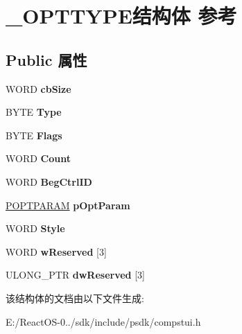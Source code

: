 \hypertarget{struct___o_p_t_t_y_p_e}{}\section{\+\_\+\+O\+P\+T\+T\+Y\+P\+E结构体 参考}
\label{struct___o_p_t_t_y_p_e}
\subsection*{Public 属性}
\begin{DoxyCompactItemize}
\item 
\mbox{\label{struct___o_p_t_t_y_p_e_a18c80c8c2c281085bd93d5357cc864bf}} 
W\+O\+RD {\bfseries cb\+Size}
\item 
\mbox{\label{struct___o_p_t_t_y_p_e_aaf0fd064e909df1f899112fe436e12f1}} 
B\+Y\+TE {\bfseries Type}
\item 
\mbox{\label{struct___o_p_t_t_y_p_e_a9d0ca25c8980f306ef6248d144d51590}} 
B\+Y\+TE {\bfseries Flags}
\item 
\mbox{\label{struct___o_p_t_t_y_p_e_ab263818e39f44378bf88f76feebc069d}} 
W\+O\+RD {\bfseries Count}
\item 
\mbox{\label{struct___o_p_t_t_y_p_e_a8466537cc6dccf4c783e9e999df16774}} 
W\+O\+RD {\bfseries Beg\+Ctrl\+ID}
\item 
\mbox{\label{struct___o_p_t_t_y_p_e_aba9b557645888ae07e119abc410782a9}} 
\hyperlink{struct___o_p_t_p_a_r_a_m}{P\+O\+P\+T\+P\+A\+R\+AM} {\bfseries p\+Opt\+Param}
\item 
\mbox{\label{struct___o_p_t_t_y_p_e_a849378bfe422ceeebb6f9ffa75808400}} 
W\+O\+RD {\bfseries Style}
\item 
\mbox{\label{struct___o_p_t_t_y_p_e_a67bb84590706d679fb037b6200bcf197}} 
W\+O\+RD {\bfseries w\+Reserved} \mbox{[}3\mbox{]}
\item 
\mbox{\label{struct___o_p_t_t_y_p_e_a12b8fa165b54b5c34dfab35e6cba0ea9}} 
U\+L\+O\+N\+G\+\_\+\+P\+TR {\bfseries dw\+Reserved} \mbox{[}3\mbox{]}
\end{DoxyCompactItemize}


该结构体的文档由以下文件生成\+:\begin{DoxyCompactItemize}
\item 
E\+:/\+React\+O\+S-\/0../sdk/include/psdk/compstui.\+h\end{DoxyCompactItemize}
